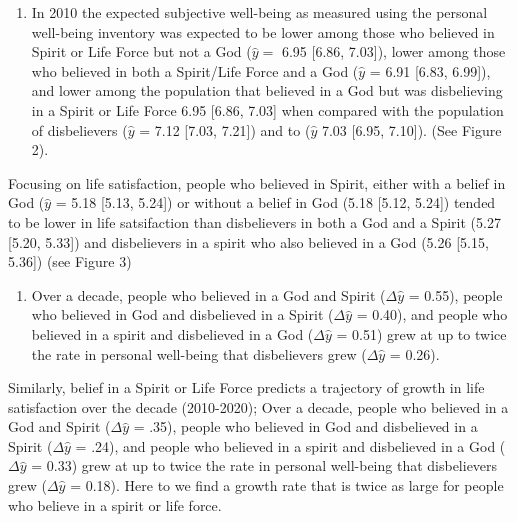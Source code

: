 \documentclass[
  english,
  man,floatsintext]{apa6}
\providecommand{\tightlist}{%
  \setlength{\itemsep}{0pt}\setlength{\parskip}{0pt}}
\begin{document}
\begin{enumerate}
\def\labelenumi{\arabic{enumi}.}
\tightlist
\item
  In 2010 the expected subjective well-being as measured using the personal well-being inventory was expected to be lower among those who believed in Spirit or Life Force but not a God (\(\hat{y} =\) 6.95 \textbar{} {[}6.86, 7.03{]}), lower among those who believed in both a Spirit/Life Force and a God (\(\hat{y}\) = 6.91 \textbar{} {[}6.83, 6.99{]}), and lower among the population that believed in a God but was disbelieving in a Spirit or Life Force 6.95 \textbar{} {[}6.86, 7.03{]} when compared with the population of disbelievers (\(\hat{y}\) = 7.12 \textbar{} {[}7.03, 7.21{]}) and to (\(\hat{y}\) 7.03 \textbar{} {[}6.95, 7.10{]}). (See Figure 2).
\end{enumerate}

Focusing on life satisfaction, people who believed in Spirit, either with a belief in God (\(\hat{y}\) = 5.18 \textbar{} {[}5.13, 5.24{]}) or without a belief in God (5.18 \textbar{} {[}5.12, 5.24{]}) tended to be lower in life satsifaction than disbelievers in both a God and a Spirit (5.27 \textbar{} {[}5.20, 5.33{]}) and disbelievers in a spirit who also believed in a God (5.26 \textbar{} {[}5.15, 5.36{]}) (see Figure 3)

\begin{enumerate}
\def\labelenumi{\arabic{enumi}.}
\setcounter{enumi}{1}
\tightlist
\item
  Over a decade, people who believed in a God and Spirit (\(\Delta \hat{y}\) = 0.55), people who believed in God and disbelieved in a Spirit (\(\Delta \hat{y}\) = 0.40), and people who believed in a spirit and disbelieved in a God (\(\Delta \hat{y}\) = 0.51) grew at up to twice the rate in personal well-being that disbelievers grew (\(\Delta \hat{y}\) = 0.26).
\end{enumerate}

Similarly, belief in a Spirit or Life Force predicts a trajectory of growth in life satisfaction over the decade (2010-2020);
Over a decade, people who believed in a God and Spirit (\(\Delta \hat{y}\) = .35), people who believed in God and disbelieved in a Spirit (\(\Delta \hat{y}\) = .24), and people who believed in a spirit and disbelieved in a God (\(\Delta \hat{y}\) = 0.33) grew at up to twice the rate in personal well-being that disbelievers grew (\(\Delta \hat{y}\) = 0.18). Here to we find a growth rate that is twice as large for people who believe in a spirit or life force.
\end{document}

